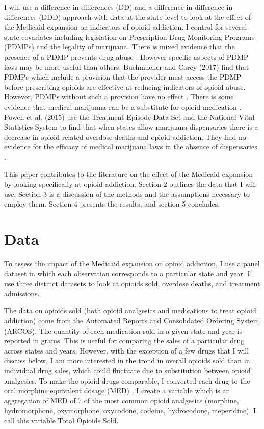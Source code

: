 \documentclass[11pt]{article}
\begin{document}
I will use a difference in differences (DD) and a difference in difference in differences (DDD) approach with data at the state level to look at the effect of the Medicaid expansion on indicators of opioid addiction.  I control for several state covariates including legislation on Prescription Drug Monitoring Programs (PDMPs) and the legality of marijuana. There is mixed evidence that the presence of a PDMP prevents drug abuse \citep{Patrick2016, Brady2014}.  However specific aspects of PDMP laws may be more useful than others. Buchmueller and Carey (2017) find that PDMPs which include a provision that the provider must access the PDMP before prescribing opioids are effective at reducing indicators of opioid abuse.  However, PDMPs without such a provision have no effect \citep{Buchmueller2017}. There is some evidence that medical marijuana can be a substitute for opioid medication \citep{Piper2017}.  Powell et al. (2015) use the Treatment Episode Data Set and the National Vital Statistics System to find that when states allow marijuana dispensaries there is a decrease in opioid related overdose deaths and opioid addiction.  They find no evidence for the efficacy of medical marijuana laws in the absence of dispensaries \citep{Powell2015}.

This paper contributes to the literature on the effect of the Medicaid expansion by looking specifically at opioid addiction.  Section 2 outlines the data that I will use.  Section 3 is a discussion of the methods and the assumptions necessary to employ them.  Section 4 presents the results, and section 5 concludes. 

\section{Data}
To assess the impact of the Medicaid expansion on opioid addiction, I use a panel dataset in which each observation corresponds to a particular state and year.  I use three distinct datasets to look at opioids sold, overdose deaths, and treatment admissions. 

The data on opioids sold (both opioid analgesics and medications to treat opioid addiction) come from the Automated Reports and Consolidated Ordering System (ARCOS).  The quantity of each medication sold in a given state and year is reported in grams. This is useful for comparing the sales of a particular drug across states and years. However, with the exception of a few drugs that I will discuss below, I am more interested in the trend in overall opioids sold than in individual drug sales, which could fluctuate due to substitution between opioid analgesics.  To make the opioid drugs comparable, I converted each drug to the oral morphine equivalent dosage (MED) \citep{Gordon1999}. I create a variable which is an aggregation of MED of 7 of the most common opioid analgesics (morphine, hydromorphone, oxymorphone, oxycodone, codeine, hydrocodone, meperidine).  I call this variable Total Opioids Sold.  
 
\end{document}
